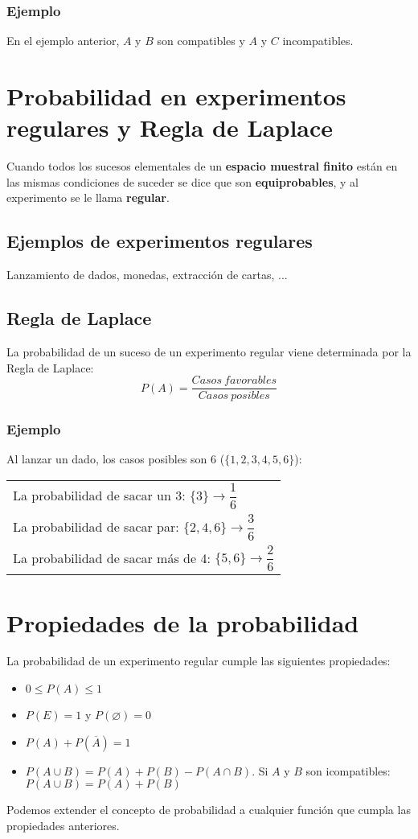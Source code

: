 \subsubsection{Ejemplo} En el ejemplo anterior, $A$ y $B$ son compatibles y $A$ y $C$ incompatibles.


\section{Probabilidad en experimentos regulares y Regla de Laplace} Cuando todos los sucesos elementales de un \textbf{espacio muestral finito} están en las mismas condiciones de suceder se dice que son \textbf{equiprobables}, y al experimento se le llama \textbf{regular}.
\subsection{Ejemplos de experimentos regulares} Lanzamiento de dados, monedas, extracción de cartas, ...

\subsection{Regla de Laplace} La probabilidad de un suceso de un experimento regular viene determinada por la Regla de Laplace:
$$P(A)=\dfrac{Casos\ favorables}{Casos\ posibles} $$
\subsubsection{Ejemplo}
Al lanzar un dado, los casos posibles son 6 ($\lbrace1,2,3,4,5,6\rbrace$):\\
\begin{tabular}{l}
La probabilidad de sacar un 3: $\lbrace3\rbrace\to \dfrac{1}{6}$\\
La probabilidad de sacar par: $\lbrace2,4,6\rbrace\to\dfrac{3}{6}$ \\
La probabilidad de sacar más de 4: $\lbrace5,6\rbrace\to\dfrac{2}{6}$
\end{tabular}

\section{Propiedades de la probabilidad} La probabilidad de un experimento regular cumple las siguientes propiedades:
\begin{itemize}
\item $0 \leq P(A) \leq 1$ 
\item $P(E) = 1$ y $P(\varnothing) = 0$
\item $P(A) + P(\overline A) = 1$
\item $P(A \cup B) = P(A) + P(B) - P(A \cap B)$. Si $A$ y $B$ son icompatibles: $P(A \cup B) = P(A) + P(B)$
\end{itemize}
Podemos extender el concepto de probabilidad a cualquier función que cumpla las propiedades anteriores.  

